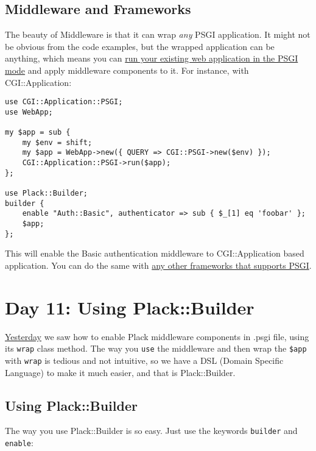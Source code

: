 \subsection{Middleware and Frameworks}\label{middleware-and-frameworks}

The beauty of Middleware is that it can wrap \emph{any} PSGI
application. It might not be obvious from the code examples, but the
wrapped application can be anything, which means you can
\href{http://advent.plackperl.org/2009/12/day-7-use-web-application-framework-in-psgi.html}{run
your existing web application in the PSGI mode} and apply middleware
components to it. For instance, with CGI::Application:

\begin{lstlisting}
use CGI::Application::PSGI;
use WebApp;

my $app = sub {
    my $env = shift;
    my $app = WebApp->new({ QUERY => CGI::PSGI->new($env) });
    CGI::Application::PSGI->run($app);
};

use Plack::Builder;
builder {
    enable "Auth::Basic", authenticator => sub { $_[1] eq 'foobar' };
    $app;
};
\end{lstlisting}

This will enable the Basic authentication middleware to CGI::Application
based application. You can do the same with
\href{http://plackperl.org/\#frameworks}{any other frameworks that
supports PSGI}.

\section{Day 11: Using Plack::Builder}\label{day-11-using-plackbuilder}

\href{http://advent.plackperl.org/2009/12/day-10-using-plack-middleware.html}{Yesterday}
we saw how to enable Plack middleware components in .psgi file, using
its \lstinline!wrap! class method. The way you \lstinline!use! the
middleware and then wrap the \lstinline!$app! with \lstinline!wrap! is
tedious and not intuitive, so we have a DSL (Domain Specific Language)
to make it much easier, and that is Plack::Builder.

\subsection{Using Plack::Builder}\label{using-plackbuilder}

The way you use Plack::Builder is so easy. Just use the keywords
\lstinline!builder! and \lstinline!enable!:

